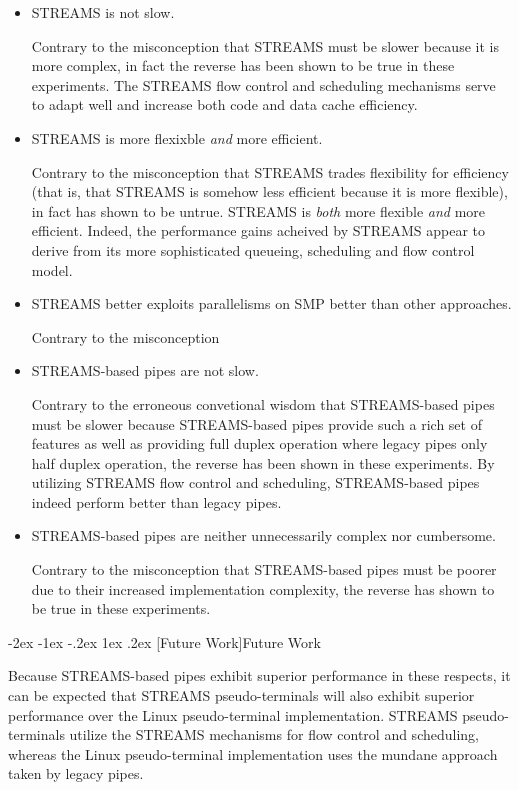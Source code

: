 \documentclass[letterpaper,final,notitlepage,twocolumn,10pt,twoside]{article}
\makeatletter
\let\large\normalsize
\let\normalsize\small
\let\small\footnotesize
\let\footnotesize\scriptsize
\let\scriptsize\tiny
\renewcommand\section{\@startsection {section}{1}{\z@}%
                                   {-2ex \@plus -1ex \@minus -.2ex}%
                                   {1ex \@plus .2ex}%
                                   {\normalfont\large\bfseries}}
\makeatother
\begin{document}
\begin{itemize}

\item STREAMS is not slow.

Contrary to the misconception that STREAMS must be slower because it is more
complex, in fact the reverse has been shown to be true in these experiments.
The STREAMS flow control and scheduling mechanisms serve to adapt well and
increase both code and data cache efficiency.

\item STREAMS is more flexixble {\em and} more efficient.

Contrary to the misconception that STREAMS trades flexibility for efficiency
(that is, that STREAMS is somehow less efficient because it is more flexible),
in fact has shown to be untrue.  STREAMS is {\em both} more flexible {\em and}
more efficient.  Indeed, the performance gains acheived by STREAMS appear to
derive from its more sophisticated queueing, scheduling and flow control
model.

\item STREAMS better exploits parallelisms on SMP better than other approaches.

Contrary to the misconception

\item STREAMS-based pipes are not slow.

Contrary to the erroneous convetional wisdom that STREAMS-based pipes must be
slower because STREAMS-based pipes provide such a rich set of features as well
as providing full duplex operation where legacy pipes only half duplex
operation, the reverse has been shown in these experiments.  By utilizing
STREAMS flow control and scheduling, STREAMS-based pipes indeed perform better
than legacy pipes.

\item STREAMS-based pipes are neither unnecessarily complex nor cumbersome.

Contrary to the misconception that STREAMS-based pipes must be poorer due to
their increased implementation complexity, the reverse has shown to be true in
these experiments.

\end{itemize}

\section[Future Work]{Future Work}

Because STREAMS-based pipes exhibit superior performance in these respects, it
can be expected that STREAMS pseudo-terminals will also exhibit superior
performance over the Linux pseudo-terminal implementation.  STREAMS
pseudo-terminals utilize the STREAMS mechanisms for flow control and
scheduling, whereas the Linux pseudo-terminal implementation uses the mundane
approach taken by legacy pipes.
\end{document}
